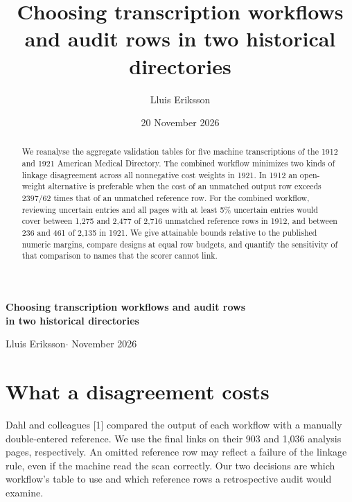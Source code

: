 \documentclass[11pt]{article}
\title{Choosing transcription workflows and audit rows in two historical directories}
\author{Lluis Eriksson}\date{20 November 2026}
\begin{document}
\begin{center}
{\Large\bfseries Choosing transcription workflows and audit rows\\[2pt] in two historical directories}\par
\vspace{5pt}Lluis Eriksson\quad$\cdot$ November 2026
\end{center}
\begin{abstract}
We reanalyse the aggregate validation tables for five machine transcriptions of the 1912 and 1921 American Medical Directory. The combined workflow minimizes two kinds of linkage disagreement across all nonnegative cost weights in 1921. In 1912 an open-weight alternative is preferable when the cost of an unmatched output row exceeds $2397/62$ times that of an unmatched reference row. For the combined workflow, reviewing uncertain entries and all pages with at least 5\% uncertain entries would cover between 1,275 and 2,477 of 2,716 unmatched reference rows in 1912, and between 236 and 461 of 2,135 in 1921. We give attainable bounds relative to the published numeric margins, compare designs at equal row budgets, and quantify the sensitivity of that comparison to names that the scorer cannot link.
\end{abstract}

\section*{What a disagreement costs}
Dahl and colleagues [1] compared the output of each workflow with a manually double-entered reference. We use the final links on their 903 and 1,036 analysis pages, respectively. An omitted reference row may reflect a failure of the linkage rule, even if the machine read the scan correctly. Our two decisions are which workflow's table to use and which reference rows a retrospective audit would examine.
\end{document}
